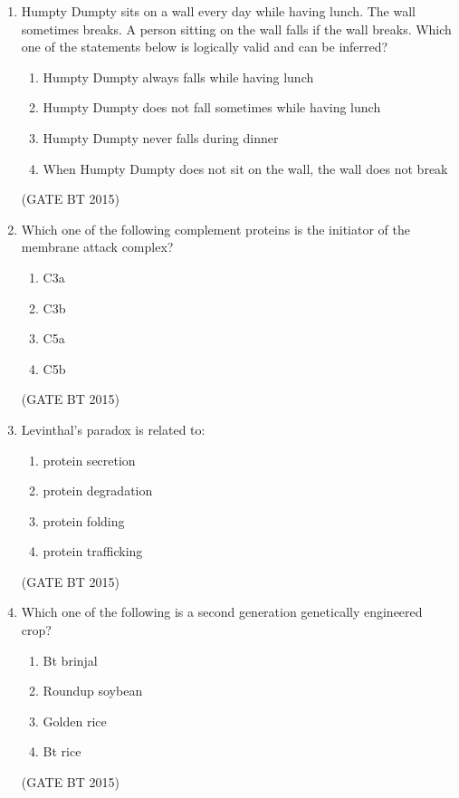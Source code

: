 \documentclass[journal,12pt,onecolumn]{IEEEtran}
\begin{document}
\begin{enumerate}[label=\textbf{Q.\arabic*}]
    \item Humpty Dumpty sits on a wall every day while having lunch. The wall sometimes breaks. A person sitting on the wall falls if the wall breaks.  
    Which one of the statements below is logically valid and can be inferred?

    \begin{enumerate}
        \item Humpty Dumpty always falls while having lunch  
        \item Humpty Dumpty does not fall sometimes while having lunch  
        \item Humpty Dumpty never falls during dinner  
        \item When Humpty Dumpty does not sit on the wall, the wall does not break  
    \end{enumerate}
    \hfill (GATE BT 2015)

    \item Which one of the following complement proteins is the initiator of the membrane attack complex?
    \begin{multicols}{4}
    \begin{enumerate}
        \item C3a  
        \item C3b  
        \item C5a  
        \item C5b  
    \end{enumerate}
    \end{multicols}             \hfill (GATE BT 2015)

    \item Levinthal's paradox is related to:
    \begin{multicols}{2}
    \begin{enumerate}
        \item protein secretion  
        \item protein degradation  
        \item protein folding  
        \item protein trafficking  
    \end{enumerate}
    \end{multicols}             \hfill (GATE BT 2015)

    \item Which one of the following is a second generation genetically engineered crop?
    \begin{multicols}{2}
    \begin{enumerate}
        \item Bt brinjal  
        \item Roundup soybean  
        \item Golden rice  
        \item Bt rice  
    \end{enumerate}
    \end{multicols}             \hfill (GATE BT 2015)


\end{enumerate}
\end{document}
